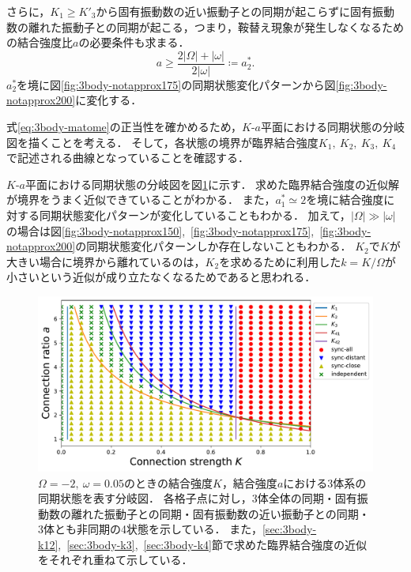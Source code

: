 \documentclass[../main]{subfiles}
\begin{document}
    さらに，$K_1\geq K'_3$から固有振動数の近い振動子との同期が起こらずに固有振動数の離れた振動子との同期が起こる，つまり，鞍替え現象が発生しなくなるための結合強度比$a$の必要条件も求まる．
    \begin{equation}
        \label{eq:a-ast2}
        a\geq \frac{2|\Omega|+|\omega|}{2|\omega|}\coloneqq a^\ast_2.    
    \end{equation}
    $a^\ast_2$を境に図\ref{fig:3body-notapprox175}の同期状態変化パターンから図\ref{fig:3body-notapprox200}に変化する．

    式\eqref{eq:3body-matome}の正当性を確かめるため，$K$-$a$平面における同期状態の分岐図を描くことを考える．
    そして，各状態の境界が臨界結合強度$K_1,\ K_2,\ K_3,\ K_4$で記述される曲線となっていることを確認する．

    $K$-$a$平面における同期状態の分岐図を図\ref{fig:3body-phase}に示す．
    求めた臨界結合強度の近似解が境界をうまく近似できていることがわかる．
    また，$a^\ast_1\simeq 2$を境に結合強度に対する同期状態変化パターンが変化していることもわかる．
    加えて，$|\Omega|\gg|\omega|$の場合は図\ref{fig:3body-notapprox150},\ \ref{fig:3body-notapprox175},\ \ref{fig:3body-notapprox200}の同期状態変化パターンしか存在しないこともわかる．
    $K_2$で$K$が大きい場合に境界から離れているのは，$K_2$を求めるために利用した$k=K/\Omega$が小さいという近似が成り立たなくなるためであると思われる．

    \begin{figure}[tbp]
    \centering
    \includegraphics[width=135mm]{images/three-body-phase.pdf}
    \centering
    \caption{$\Omega=-2,\ \omega=0.05$のときの結合強度$K$，結合強度$a$における3体系の同期状態を表す分岐図．
    各格子点に対し，3体全体の同期・固有振動数の離れた振動子との同期・固有振動数の近い振動子との同期・3体とも非同期の4状態を示している．
    また，\ref{sec:3body-k12},\ \ref{sec:3body-k3},\ \ref{sec:3body-k4}節で求めた臨界結合強度の近似をそれぞれ重ねて示している．
    }
    \label{fig:3body-phase}
    \end{figure}
\end{document}
